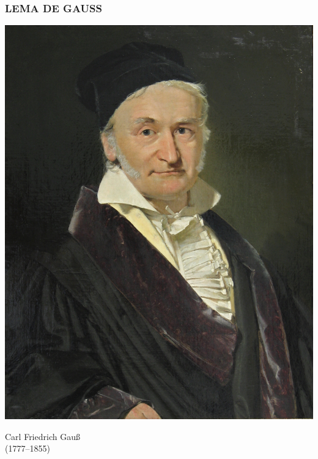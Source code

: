 \begin{frame}
  \frametitle{LEMA DE GAUSS}

  \begin{minipage}[t][0.6\textheight]{0.6\textwidth}
    \vspace{0pt}

    \vspace{1em}


  \end{minipage}
  \begin{minipage}[t]{0.35\textwidth}
    \vspace{0pt}\flushright
    \includegraphics[width=.9\textwidth]{gauss.jpg}

    Carl Friedrich Gauß \\
    (1777--1855)
  \end{minipage}
\end{frame}

